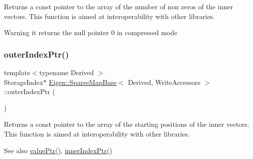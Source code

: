 \begin{DoxyReturn}{Returns}
a const pointer to the array of the number of non zeros of the inner vectors. This function is aimed at interoperability with other libraries. 
\end{DoxyReturn}
\begin{DoxyWarning}{Warning}
it returns the null pointer 0 in compressed mode 
\end{DoxyWarning}
\mbox{\label{class_eigen_1_1_sparse_map_base_3_01_derived_00_01_write_accessors_01_4_a3b74af754254837fc591cd9936688b95}} 
\subsubsection{\texorpdfstring{outerIndexPtr()}{outerIndexPtr()}}
{\footnotesize\ttfamily template$<$typename Derived $>$ \\
Storage\+Index$\ast$ \mbox{\hyperlink{class_eigen_1_1_sparse_map_base}{Eigen\+::\+Sparse\+Map\+Base}}$<$ Derived, Write\+Accessors $>$\+::outer\+Index\+Ptr (\begin{DoxyParamCaption}{ }\end{DoxyParamCaption})\hspace{0.3cm}{\ttfamily [inline]}}





\begin{DoxyReturn}{Returns}
a const pointer to the array of the starting positions of the inner vectors. This function is aimed at interoperability with other libraries. 
\end{DoxyReturn}
\begin{DoxySeeAlso}{See also}
\mbox{\hyperlink{class_eigen_1_1_sparse_map_base_3_01_derived_00_01_write_accessors_01_4_af91648a18729ae8ff29cb1d8751c5655}{value\+Ptr()}}, \mbox{\hyperlink{class_eigen_1_1_sparse_map_base_3_01_derived_00_01_write_accessors_01_4_af5cd1f13dde8578eb9891a4ac4a11977}{inner\+Index\+Ptr()}} 
\end{DoxySeeAlso}
\mbox{\label{class_eigen_1_1_sparse_map_base_3_01_derived_00_01_write_accessors_01_4_af91648a18729ae8ff29cb1d8751c5655}} 
